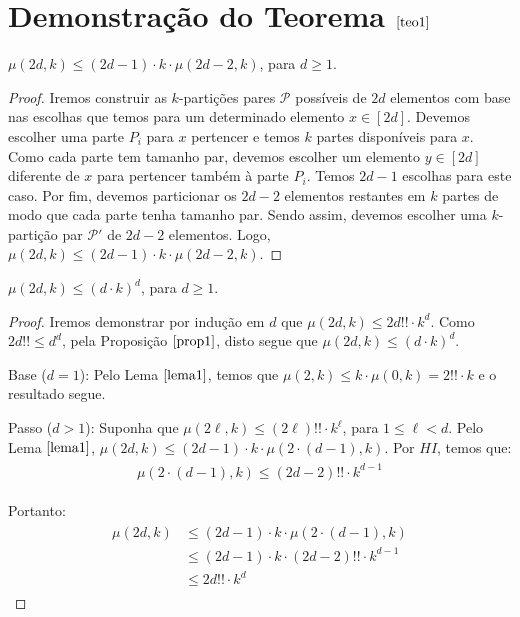  \section{Demonstração do Teorema $\ref{teo1}$} \newl

\begin{lema}  
	\label{lema1} 
	$\mu(2d, k) \leq (2d - 1) \cdot k \cdot \mu(2d - 2, k)$, para $d \geq 1$.
\end{lema}

\begin{proof} Iremos construir as $k$-partições pares $\mathcal{P}$ possíveis de $2d$ elementos com base nas escolhas que temos para um determinado elemento $x \in [2d]$. Devemos escolher uma parte $P_i$ para $x$ pertencer e temos $k$ partes disponíveis para $x$. Como cada parte tem tamanho par, devemos escolher um elemento $y \in [2d]$ diferente de $x$ para pertencer também à parte $P_i$. Temos $2d - 1$ escolhas para este caso. Por fim, devemos particionar os $2d - 2$ elementos restantes em $k$ partes de modo que cada parte tenha tamanho par. Sendo assim, devemos escolher uma $k$-partição par $\mathcal{P'}$ de $2d - 2$ elementos. Logo, $\mu(2d, k) \leq (2d - 1) \cdot k \cdot \mu(2d - 2, k)$. 
	
\end{proof} \newl


\begin{lema}  
	\label{lema2} 
	$\mu(2d, k) \leq (d {\cdot} k)^d$, para $d \geq 1$.
\end{lema}

\begin{proof} Iremos demonstrar por indução em $d$ que $\mu(2d, k) \leq 2d!! \cdot k^d$. Como $2d!! \leq d^d$, pela Proposição $\ref{prop1}$, disto segue que $\mu(2d, k) \leq (d {\cdot} k)^d$. 
	
	Base ($d = 1$): Pelo Lema $\ref{lema1}$, temos que $\mu(2, k) \leq k \cdot \mu(0, k)= 2!! \cdot k$ e o resultado segue.
	
	Passo ($d > 1$): Suponha que $\mu(2\ell, k) \leq (2\ell)!! \cdot k^{\ell}$, para $1 \leq \ell < d$. Pelo Lema $\ref{lema1}$, $\mu(2d, k) \leq (2d - 1) \cdot k \cdot \mu(2 {\cdot} (d - 1), k)$. Por $HI$, temos que: 
	\begin{align}
		\begin{split}
			\mu(2 {\cdot} (d - 1), k) \leq (2d - 2)!! \cdot k^{d-1}
		\end{split} 
	\end{align} 
	
	Portanto: 
	\begin{align}
		\begin{split}
			\mu(2d, k) &\leq (2d - 1) \cdot k \cdot \mu(2 {\cdot} (d - 1), k) \\
			&\leq (2d - 1) \cdot k \cdot (2d - 2)!! \cdot k^{d-1} \\
			&\leq 2d!! \cdot k^d
		\end{split} 
	\end{align} 
	
\end{proof} \newl


